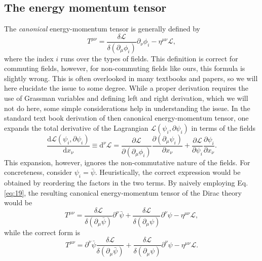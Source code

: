 \subsection{The energy momentum tensor}
The \emph{canonical} energy-momentum tensor is generally defined by
\begin{equation}
  \label{eq:19}
  T^{\mu \nu} =  \frac{\delta \mathcal{L}}{\delta(\partial_{\mu} \phi_{i})} \partial_{\nu} \phi_i - \eta^{\mu \nu} \mathcal{L},
\end{equation}
where the index \( i \) runs over the types of fields.
This definition is correct for commuting fields, however, for non-commuting fields like ours, this formula is slightly wrong.
This is often overlooked in many textbooks and papers, so we will here elucidate the issue to some degree.
While a proper derivation requires the use of Grassman variables and defining left and right derivation, which we will not do here, some simple considerations help in understanding the issue.
In the standard text book derivation of then canonical energy-momentum tensor, one expands the total derivative of the Lagrangian \( \mathcal{L}(\psi_i, \partial \psi_i)\) in terms of the fields
\begin{equation}
  \label{eq:30}
  \frac{\mathrm{d} \mathcal{L}(\psi_{i}, \partial \psi_i)}{\mathrm{d} x_{\nu }} \equiv \mathrm{d}^{\nu } \mathcal{L}
  = \frac{\partial \mathcal{L}}{\partial (\partial_{\mu } \phi_i)} \frac{\partial(\partial _{\mu } \psi_i)}{\partial x_{\nu }}
  + \frac{\partial \mathcal{L}}{\partial \psi _{i}} \frac{\partial \psi_i}{\partial x_{\nu }}.
\end{equation}
This expansion, however, ignores the non-commutative nature of the fields.
For concreteness, consider \( \psi _i = \bar{\psi} \).
Heuristically, the correct expression would be obtained by reordering the factors in the two terms.
By naively employing Eq. \eqref{eq:19}, the resulting canonical energy-momentum tensor of the Dirac theory would be
\begin{equation}
  T^{\mu \nu} = \frac{\delta \mathcal{L}}{\delta (\partial_{\mu} \bar{\psi})} \partial^{\nu} \bar{\psi}  + \frac{\delta \mathcal{L}}{\delta (\partial_{\mu} \psi)} \partial^{\nu} \psi - \eta^{\mu \nu} \mathcal{L},
\end{equation}
while the correct form is \cite[Eq.~3-153]{itzyksonQuantumFieldTheory1980}
\begin{equation}
  \label{eq:21}
  T^{\mu \nu} = \partial^{\nu} \bar{\psi} \frac{\delta \mathcal{L}}{\delta (\partial_{\mu} \bar{\psi})} + \frac{\delta \mathcal{L}}{\delta (\partial_{\mu} \psi)} \partial^{\nu} \psi - \eta^{\mu \nu} \mathcal{L}.
\end{equation}

